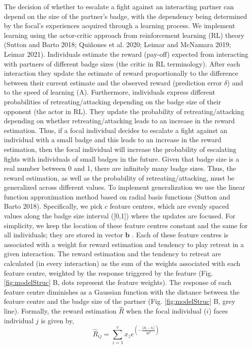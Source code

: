 \documentclass[
  12pt,
]{article}
\begin{document}
The decision of whether to escalate a fight against an interacting
partner can depend on the size of the partner's badge, with the
dependency being determined by the focal's experiences acquired through
a learning process. We implement learning using the actor-critic
approach from reinforcement learning (RL) theory (Sutton and Barto 2018;
Quiñones et al. 2020; Leimar and McNamara 2019; Leimar 2021).
Individuals estimate the reward (pay-off) expected from interacting with
partners of different badge sizes (the critic in RL terminology). After
each interaction they update the estimate of reward proportionally to
the difference between their current estimate and the observed reward
(prediction error \(\delta\)) and to the speed of learning
(\(\mathrm{A}\)). Furthermore, individuals express different
probabilities of retreating/attacking depending on the badge size of
their opponent (the actor in RL). They update the probability of
retreating/attacking depending on whether retreating/attacking leads to
an increase in the reward estimation. Thus, if a focal individual
decides to escalate a fight against an individual with a small badge and
this leads to an increase in the reward estimation, then the focal
individual will increase the probability of escalating fights with
individuals of small badges in the future. Given that badge size is a
real number between 0 and 1, there are infinitely many badge sizes.
Thus, the reward estimation, as well as the probability of
retreating/attacking, must be generalized across different values. To
implement generalization we use the linear function approximation method
based on radial basis functions (Sutton and Barto 2018). Specifically,
we pick \(c\) feature centres, which are evenly spaced values along the
badge size interval ({[}0,1{]}) where the updates are focused. For
simplicity, we keep the location of these feature centres constant and
the same for all individuals; they are stored in vector \(\symbf{b}\) .
Each of these feature centres is associated with a weight for reward
estimation and tendency to play retreat in a given interaction. The
reward estimation and the tendency to retreat are calculated (in every
interaction) as the sum of the weights associated with each feature
centre, weighted by the response triggered by the feature (Fig.
\ref{fig:modelStruc} B, dots represent the feature weights). The
response of each feature centre diminishes as a Gaussian function with
the distance between the feature centre and the badge size of the
partner (Fig. \ref{fig:modelStruc} B, grey line). Formally, the reward
estimation \(\hat{R}\) when the focal individual (\(i\)) faces
individual \(j\) is given by,\\
\begin{equation}
\hat{R}_{ij} =  \sum_{z=1}^{c} x_z e^{(-\frac{|B_i-b_z|}{2\theta^2})} 
\end{equation}
\end{document}
